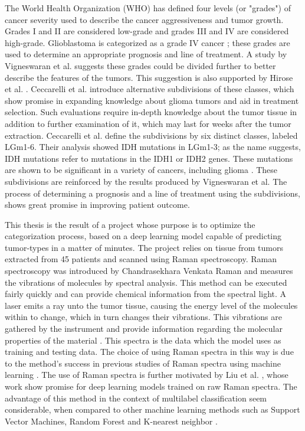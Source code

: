 The World Health Organization (WHO) has defined four levels (or "grades") of cancer severity used to describe the cancer aggressiveness and tumor growth. Grades I and II are considered low-grade and grades III and IV are considered high-grade. Glioblastoma is categorized as a grade IV cancer \cite{bleeker2012recent, gradesandpriorsubdivision}; these grades are used to determine an appropriate prognosis and line of treatment. A study by Vigneswaran et al. \cite{gradesandpriorsubdivision} suggests these grades could be divided further to better describe the features of the tumors. This suggestion is also supported by Hirose et al. \cite{hirose2013subgrouping}. Ceccarelli et al. \cite{cellsubsets} introduce alternative subdivisions of these classes, which show promise in expanding knowledge about glioma tumors and aid in treatment selection. Such evaluations require in-depth knowledge about the tumor tissue in addition to further examination of it, which may last for weeks after the tumor extraction. Ceccarelli et al. define the subdivisions by six distinct classes, labeled LGm1-6. Their analysis showed IDH mutations in LGm1-3; as the name suggests, IDH mutations refer to mutations in the IDH1 or IDH2 genes. These mutations are shown to be significant in a variety of cancers, including glioma \cite{dang2016idh}. %
These subdivisions are reinforced by the results produced by Vigneswaran et al. The process of determining a prognosis and a line of treatment using the subdivisions, shows great promise in improving patient outcome.

This thesis is the result of a project whose purpose is to optimize the categorization process, based on a deep learning model capable of predicting tumor-types in a matter of minutes. The project relies on tissue from tumors extracted from 45 patients and scanned using Raman spectroscopy. Raman spectroscopy was introduced by Chandrasekhara Venkata Raman and measures the vibrations of molecules by spectral analysis. This method can be executed fairly quickly and can provide chemical information from the spectral light. A laser emits a ray unto the tumor tissue, causing the energy level of the molecules within to change, which in turn changes their vibrations. This vibrations are gathered by the instrument and provide information regarding the molecular properties of the material \cite{long1977raman, graves1989practical}. This spectra is the data which the model uses as training and testing data. The choice of using Raman spectra in this way is due to the method's success in previous studies of Raman spectra using machine learning \cite{ramanDL, ho2019rapid}. The use of Raman spectra is further motivated by Liu et al. \cite{liu2017deep}, whose work show promise for deep learning models trained on raw Raman spectra. The advantage of this method in the context of multilabel classification seem considerable, when compared to other machine learning methods such as Support Vector Machines, Random Forest and K-nearest neighbor \cite{liu2017deep}.

